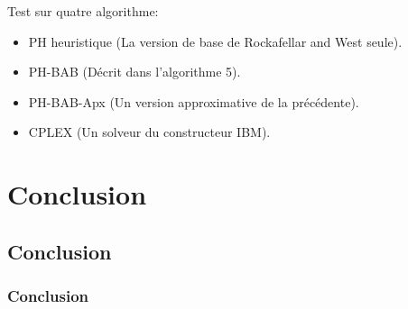 \documentclass[10pt]{beamer}
\begin{document}
    \begin{frame}
        Test sur quatre algorithme:\\
        \begin{itemize}
            \item PH heuristique (La version de base de Rockafellar and West seule).
            \item PH-BAB (Décrit dans l'algorithme 5).
            \item PH-BAB-Apx (Un version approximative de la précédente).
            \item CPLEX (Un solveur du constructeur IBM).
        \end{itemize}
    \end{frame}
    
    \begin{frame}

    \end{frame}
    
    \section{Conclusion}
    \subsection{Conclusion}
    \begin{frame}
        \frametitle{Conclusion}
        
    \end{frame}
    
    \iffalse
    \fi
\end{document}
